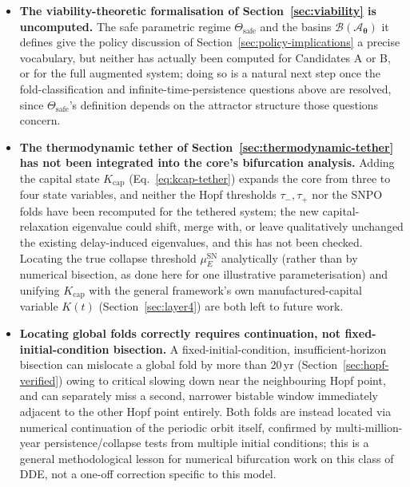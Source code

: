 \documentclass[twocolumn,10pt]{article}
\begin{document}
\begin{itemize}
\item \textbf{The viability-theoretic formalisation of Section~\ref{sec:viability} is uncomputed.} The safe parametric regime $\Theta_{\text{safe}}$ and the basins $\mathcal B(\mathcal A_{\boldsymbol\theta})$ it defines give the policy discussion of Section~\ref{sec:policy-implications} a precise vocabulary, but neither has actually been computed for Candidates A or B, or for the full augmented system; doing so is a natural next step once the fold-classification and infinite-time-persistence questions above are resolved, since $\Theta_{\text{safe}}$'s definition depends on the attractor structure those questions concern.
\item \textbf{The thermodynamic tether of Section~\ref{sec:thermodynamic-tether} has not been integrated into the core's bifurcation analysis.} Adding the capital state $K_{\text{cap}}$ (Eq.~\eqref{eq:kcap-tether}) expands the core from three to four state variables, and neither the Hopf thresholds $\tau_-,\tau_+$ nor the SNPO folds have been recomputed for the tethered system; the new capital-relaxation eigenvalue could shift, merge with, or leave qualitatively unchanged the existing delay-induced eigenvalues, and this has not been checked. Locating the true collapse threshold $\mu_E^{\text{SN}}$ analytically (rather than by numerical bisection, as done here for one illustrative parameterisation) and unifying $K_{\text{cap}}$ with the general framework's own manufactured-capital variable $K(t)$ (Section~\ref{sec:layer4}) are both left to future work.
\item \textbf{Locating global folds correctly requires continuation, not fixed-initial-condition bisection.} A fixed-initial-condition, insufficient-horizon bisection can mislocate a global fold by more than 20\,yr (Section~\ref{sec:hopf-verified}) owing to critical slowing down near the neighbouring Hopf point, and can separately miss a second, narrower bistable window immediately adjacent to the other Hopf point entirely. Both folds are instead located via numerical continuation of the periodic orbit itself, confirmed by multi-million-year persistence/collapse tests from multiple initial conditions; this is a general methodological lesson for numerical bifurcation work on this class of DDE, not a one-off correction specific to this model.

\end{itemize}
\end{document}
